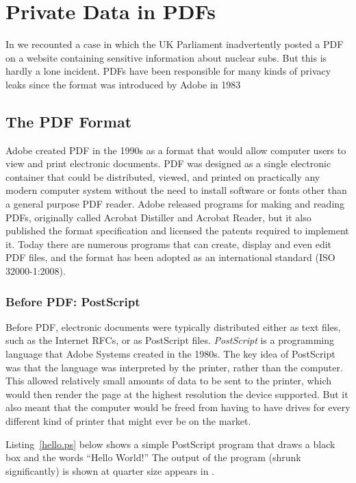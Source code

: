 \chapter{Private Data in PDFs}

In  we recounted a case in which the UK
Parliament inadvertently posted a PDF on a website containing
sensitive information about nuclear subs. But this is hardly a lone
incident. PDFs have been responsible for many kinds of privacy leaks
since the format was introduced by Adobe in 1983

\section{The PDF Format}

Adobe created PDF in the 1990s as a format that would allow computer
users to view and print electronic documents. PDF was designed as a
single electronic container that could be distributed, viewed, and
printed on practically any modern computer system without the need to
install  software or fonts other than a general purpose PDF
reader. Adobe released programs for making and reading PDFs,
originally called Acrobat Distiller and Acrobat Reader, but it also
published the format specification and licensed the patents required
to implement it. Today there are numerous programs that can create,
display and even edit PDF files, and the format has been adopted as an
international standard (ISO 32000-1:2008)\cite{ISO32000-1:2008}.

\subsection{Before PDF: PostScript}

Before PDF, electronic documents were typically distributed either as text
files, such as the Internet RFCs, or as PostScript
files. \emph{PostScript} is a programming language that Adobe Systems
created in the 1980s. The key idea 
of PostScript was that the language was interpreted by the printer, rather than 
the computer. This allowed relatively small amounts of data to be sent to
the printer, which would then render the page at the highest resolution
the device supported. But it also meant that the computer would be
freed from having to have drives for every different kind of printer
that might ever be on the market.

Listing~\ref{hello.ps} below shows a simple PostScript program that draws a
black box and the words ``Hello World!''  The output of the program
(shrunk significantly) is shown at quarter size appears in
. 

